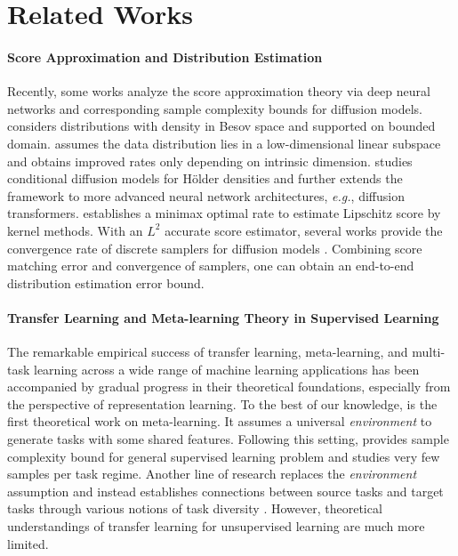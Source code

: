 \section{Related Works}
\paragraph{Score Approximation and Distribution Estimation}

Recently, some works analyze the score approximation theory via deep neural networks and corresponding sample complexity bounds for diffusion models.
\citet{oko2023diffusion} considers distributions with density in Besov space and supported on bounded domain.
\citet{chen2023score} assumes the data distribution lies in a low-dimensional linear subspace and obtains improved rates only depending on intrinsic dimension.
\citet{fu2024unveil} studies conditional diffusion models for H\"older densities and \citet{hu2024statistical} further extends the framework to more advanced neural network architectures, \textit{e.g.}, diffusion transformers.
\citet{wibisono2024optimal} establishes a minimax optimal rate to estimate Lipschitz score by kernel methods.
With an $L^2$ accurate score estimator, several works provide the convergence rate of discrete samplers for diffusion models \citep{chen2022sampling,chen2023improved,lee2023convergence,chen2024probability}. 
Combining score matching error and convergence of samplers, one can obtain an end-to-end distribution estimation error bound.

\paragraph{Transfer Learning and Meta-learning Theory in Supervised Learning}

The remarkable empirical success of transfer learning, meta-learning, and multi-task learning across a wide range of machine learning applications has been accompanied by gradual progress in their theoretical foundations, especially from
the perspective of representation learning.
To the best of our knowledge, \citet{baxter2000model} is the first theoretical work on meta-learning.
It assumes a universal \textit{environment} to generate tasks with some shared features.
Following this setting, \citet{maurer2016benefit} provides sample complexity bound for general supervised learning problem and \citet{aliakbarpour2024metalearning} studies very few samples per task regime. 
Another line of research replaces the \textit{environment} assumption and instead establishes connections between source tasks and target tasks through various notions of task diversity \citep{tripuraneni2020theory,du2020few,tripuraneni2021provable,watkins2023optimistic,chua2021fine}.
However, theoretical understandings of transfer learning for unsupervised learning are much more limited.

